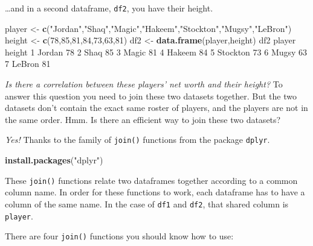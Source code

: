 \documentclass[
]{book}
\newenvironment{Shaded}{\begin{snugshade}}{\end{snugshade}}
\newcommand{\DecValTok}[1]{\textcolor[rgb]{0.00,0.00,0.81}{#1}}
\newcommand{\KeywordTok}[1]{\textcolor[rgb]{0.13,0.29,0.53}{\textbf{#1}}}
\newcommand{\NormalTok}[1]{#1}
\newcommand{\StringTok}[1]{\textcolor[rgb]{0.31,0.60,0.02}{#1}}
\begin{document}
\ldots and in a second dataframe, \texttt{df2}, you have their height.

\begin{Shaded}
\begin{Highlighting}[]
\NormalTok{player <-}\StringTok{ }\KeywordTok{c}\NormalTok{(}\StringTok{"Jordan"}\NormalTok{,}\StringTok{"Shaq"}\NormalTok{,}\StringTok{"Magic"}\NormalTok{,}\StringTok{"Hakeem"}\NormalTok{,}\StringTok{"Stockton"}\NormalTok{,}\StringTok{"Mugsy"}\NormalTok{,}\StringTok{"LeBron"}\NormalTok{)}
\NormalTok{height <-}\StringTok{ }\KeywordTok{c}\NormalTok{(}\DecValTok{78}\NormalTok{,}\DecValTok{85}\NormalTok{,}\DecValTok{81}\NormalTok{,}\DecValTok{84}\NormalTok{,}\DecValTok{73}\NormalTok{,}\DecValTok{63}\NormalTok{,}\DecValTok{81}\NormalTok{)}
\NormalTok{df2 <-}\StringTok{ }\KeywordTok{data.frame}\NormalTok{(player,height)}
\NormalTok{df2}
\NormalTok{    player height}
\DecValTok{1}\NormalTok{   Jordan     }\DecValTok{78}
\DecValTok{2}\NormalTok{     Shaq     }\DecValTok{85}
\DecValTok{3}\NormalTok{    Magic     }\DecValTok{81}
\DecValTok{4}\NormalTok{   Hakeem     }\DecValTok{84}
\DecValTok{5}\NormalTok{ Stockton     }\DecValTok{73}
\DecValTok{6}\NormalTok{    Mugsy     }\DecValTok{63}
\DecValTok{7}\NormalTok{   LeBron     }\DecValTok{81}
\end{Highlighting}
\end{Shaded}

\emph{Is there a correlation between these players' net worth and their height?} To answer this question you need to join these two datasets together. But the two datasets don't contain the exact same roster of players, and the players are not in the same order. Hmm. Is there an efficient way to join these two datasets?

\emph{Yes!} Thanks to the family of \texttt{join()} functions from the package \texttt{dplyr}.

\begin{Shaded}
\begin{Highlighting}[]
\KeywordTok{install.packages}\NormalTok{(}\StringTok{"dplyr"}\NormalTok{)}
\end{Highlighting}
\end{Shaded}

These \texttt{join()} functions relate two dataframes together according to a common column name. In order for these functions to work, each dataframe has to have a column of the same name. In the case of \texttt{df1} and \texttt{df2}, that shared column is \texttt{player}.

There are four \texttt{join()} functions you should know how to use:
\end{document}

